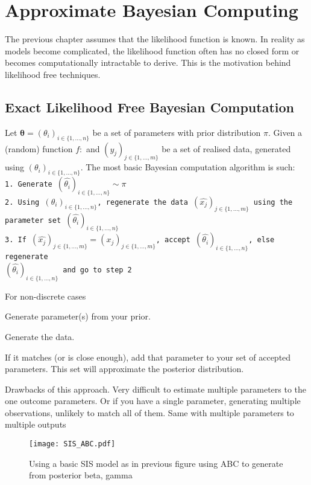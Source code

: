 \chapter{Approximate Bayesian Computing}

The previous chapter assumes that the likelihood function is known. In reality as models become complicated, the likelihood function often has no closed form or becomes computationally intractable to derive. This is the motivation behind likelihood free techniques.

\section{Exact Likelihood Free Bayesian Computation}

Let $\bm{\theta} = (\theta_i)_{i\in \{1,\dots, n\}}$ be a set of parameters with prior distribution $\pi.$ Given a (random) function $f:$ and $(y_j)_{j\in \{1,\dots, m\}}$ be a set of realised data, generated using $(\theta_i)_{i\in \{1,\dots, n\}}$. The most basic Bayesian computation algorithm is such:
\texttt{\\
    1. Generate $(\hat{\theta_i})_{i\in \{1,\dots, n\}}\sim \pi$\\
    2. Using $(\theta_i)_{i\in \{1,\dots, n\}}$, regenerate the data $(\hat{x_j})_{j\in \{1,\dots, m\}}$ using the\\ parameter set $(\hat{\theta_i})_{i\in \{1,\dots, n\}}$\\
    3. If $(\hat{x_j})_{j\in \{1,\dots, m\}} = (x_j)_{j\in \{1,\dots, m\}}$, accept $(\hat{\theta_i})_{i\in \{1,\dots, n\}}$, else regenerate\\ $(\hat{\theta_i})_{i\in \{1,\dots, n\}}$ and go to step 2
}

For non-discrete cases

Generate parameter(s) from your prior.

Generate the data.

If it matches (or is close enough), add that parameter to your set of accepted parameters. This set will approximate the posterior distribution.

Drawbacks of this approach. Very difficult to estimate multiple parameters to the one outcome parameters. Or if you have a single parameter, generating multiple observations, unlikely to match all of them. Same with multiple parameters to multiple outputs

\begin{figure}[htbp]
    \centering
    \texttt{[image: SIS\_ABC.pdf]}
    \caption{Using a basic SIS model as in previous figure using ABC to generate from posterior beta, gamma}
    \label{fig:ABC_R}
\end{figure}

